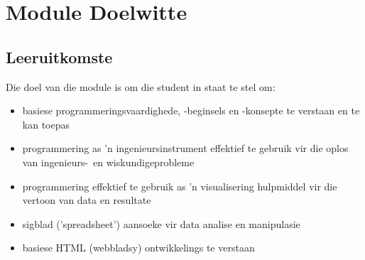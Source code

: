 \section{Module Doelwitte}
    \subsection{Leeruitkomste}
        Die doel van die module is om die student in staat te stel om:
        \begin{itemize}
            \item basiese programmeringsvaardighede, -beginsels en -konsepte te verstaan en te kan toepas
            \item programmering as 'n ingenieursinstrument effektief te gebruik
		  vir die oplos van ingenieurs- en wiskundigeprobleme
            \item programmering effektief te gebruik as 'n visualisering hulpmiddel 
		  vir die vertoon van data en resultate
            \item sigblad ('spreadsheet') aansoeke vir data analise en manipulasie
            \item basiese HTML (webbladsy) ontwikkelings te verstaan %
        \end{itemize}
        

